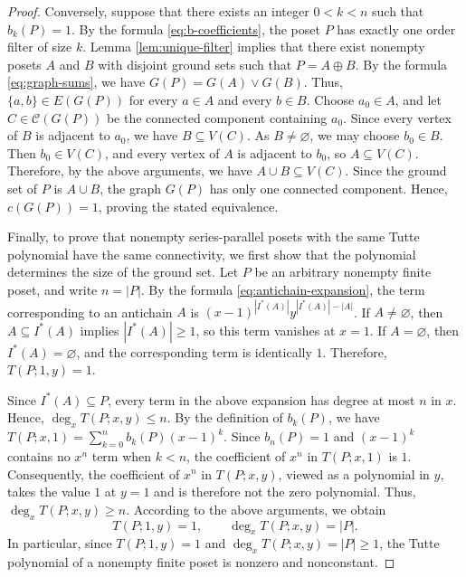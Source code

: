 \documentclass[10pt,a4paper]{amsart}
\begin{document}
\begin{proof}
Conversely, suppose that there exists an integer $0<k<n$ such that $b_k(P)=1$.
By the formula \eqref{eq:b-coefficients}, the poset $P$ has exactly one order filter of size $k$.
Lemma \ref{lem:unique-filter} implies that there exist nonempty posets $A$ 
and $B$ with disjoint ground sets such that $P=A\oplus B$.
By the formula \eqref{eq:graph-sums}, we have $G(P)=G(A)\vee G(B)$.
Thus, $\{a,b\}\in E(G(P))$ for every $a\in A$ and every $b\in B$.
Choose $a_0\in A$, and let $C\in\mathcal C(G(P))$ be the connected component containing $a_0$.
Since every vertex of $B$ is adjacent to $a_0$, we have $B\subseteq V(C)$.
As $B\neq\varnothing$, we may choose $b_0\in B$.
Then $b_0\in V(C)$, and every vertex of $A$ is adjacent to $b_0$, so $A\subseteq V(C)$.
Therefore, by the above arguments, we have $A\cup B\subseteq V(C)$.
Since the ground set of $P$ is $A\cup B$, the graph $G(P)$ has only one connected component.
Hence, $c(G(P))=1$, proving the stated equivalence.

Finally, to prove that nonempty series-parallel posets
with the same Tutte polynomial have the same connectivity,
we first show that the polynomial determines the size of the ground set.
Let $P$ be an arbitrary nonempty finite poset, and write $n=|P|$.
By the formula \eqref{eq:antichain-expansion}, the term corresponding to an antichain $A$ is
$(x-1)^{|I^*(A)|}y^{|I^*(A)|-|A|}$.
If $A\neq\varnothing$, then $A\subseteq I^*(A)$ implies
$|I^*(A)|\geq 1$, so this term vanishes at $x=1$.
If $A=\varnothing$, then $I^*(A)=\varnothing$,
and the corresponding term is identically $1$.
Therefore, $T(P;1,y)=1$.

Since $I^*(A)\subseteq P$, every term in the above expansion has degree at most $n$ in $x$.
Hence, $\deg_x T(P;x,y)\leq n$.
By the definition of $b_k(P)$, we have $T(P;x,1)=\sum_{k=0}^{n}b_k(P)(x-1)^k$.
Since $b_n(P)=1$ and $(x-1)^k$ contains no $x^n$ term when $k<n$, 
the coefficient of $x^n$ in $T(P;x,1)$ is $1$.
Consequently, the coefficient of $x^n$ in $T(P;x,y)$,
viewed as a polynomial in $y$, takes the value $1$ at $y=1$ and is therefore not the zero polynomial.
Thus, $\deg_x T(P;x,y)\geq n$.
According to the above arguments, we obtain
\begin{equation}\label{eq:normalization-degree}
T(P;1,y)=1,\qquad \deg_x T(P;x,y)=|P|.
\end{equation}
In particular, since $T(P;1,y)=1$ and $\deg_x T(P;x,y)=|P|\geq 1$,
the Tutte polynomial of a nonempty finite poset is nonzero and nonconstant.


\end{proof}
\end{document}

